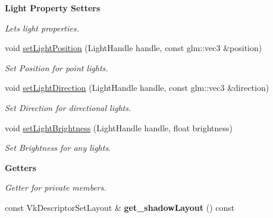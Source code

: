 \begin{Indent}\textbf{ Light Property Setters}\par
{\em Let\textquotesingle{}s light properties. }\begin{DoxyCompactItemize}
\item 
\mbox{\label{classblaze_1_1ShadowCaster_a0103ea4ef91351bcc16f1d4c5b6cafe2}} 
void \hyperlink{classblaze_1_1ShadowCaster_a0103ea4ef91351bcc16f1d4c5b6cafe2}{set\+Light\+Position} (Light\+Handle handle, const glm\+::vec3 \&position)
\begin{DoxyCompactList}\small\item\em Set Position for point lights. \end{DoxyCompactList}\item 
\mbox{\label{classblaze_1_1ShadowCaster_ab19b363ea0d3bebb997d5a40348e1fa9}} 
void \hyperlink{classblaze_1_1ShadowCaster_ab19b363ea0d3bebb997d5a40348e1fa9}{set\+Light\+Direction} (Light\+Handle handle, const glm\+::vec3 \&direction)
\begin{DoxyCompactList}\small\item\em Set Direction for directional lights. \end{DoxyCompactList}\item 
\mbox{\label{classblaze_1_1ShadowCaster_aeb059d2fd4b621d04e0df76326b6d39f}} 
void \hyperlink{classblaze_1_1ShadowCaster_aeb059d2fd4b621d04e0df76326b6d39f}{set\+Light\+Brightness} (Light\+Handle handle, float brightness)
\begin{DoxyCompactList}\small\item\em Set Brightness for any lights. \end{DoxyCompactList}\end{DoxyCompactItemize}
\end{Indent}
\begin{Indent}\textbf{ Getters}\par
{\em Getter for private members. }\begin{DoxyCompactItemize}
\item 
\mbox{\label{classblaze_1_1ShadowCaster_a296739402ebcefc4cf34e2255c682285}} 
const Vk\+Descriptor\+Set\+Layout \& {\bfseries get\+\_\+shadow\+Layout} () const
\end{DoxyCompactItemize}
\end{Indent}
